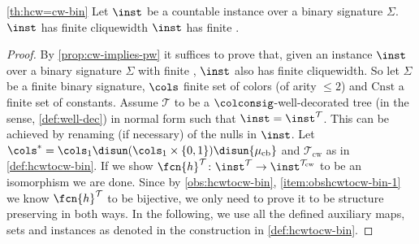 \begin{customprop}{\ref{th:hcw=cw-bin}}
	Let $\inst$ be a countable instance over a binary signature $\Sigma$.
	$\inst$ has finite cliquewidth \iffi $\inst$ has finite \ercwidth{}.
\end{customprop}
\begin{proof}
	By \cref{prop:cw-implies-pw} it suffices to prove that, given an instance $\inst$ over a binary signature $\Sigma$ with finite \partitionwidth{}, $\inst$ also has finite cliquewidth.
	So let $\Sigma$ be a finite binary signature, $\cols$ finite set of colors (of arity $\le 2$) and $\mathrm{Cnst}$ a finite set of constants. 
	Assume $\mathcal{T}$ to be a $\colconsig$-well-decorated tree (in the \partitionwidth{} sense, \cref{def:well-dec}) in normal form such that $\inst = \inst^{\mathcal{T}}$. This can be achieved by renaming (if necessary) of the nulls in $\inst$. 
	Let $\cols^{\ast} = \cols_1\disun (\cols_1\times \{ 0,1 \})\disun \{ \mu_{\mathrm{cb}}\}$ and $\mathcal{T}_{\mathrm{cw}}$ as in \cref{def:hcwtocw-bin}. If we show $\fcn{h}^{\mathcal{T}}\colon \inst^{\mathcal{T}} \to \inst^{\mathcal{T}_{\mathrm{cw}}}$ to be an isomorphism we are done. Since by \cref{obs:hcwtocw-bin}, \cref{item:obshcwtocw-bin-1} we know $\fcn{h}^{\mathcal{T}}$ to be bijective, we only need to prove it to be structure preserving in both ways. In the following, we use all the defined auxiliary maps, sets and instances as denoted in the construction in \cref{def:hcwtocw-bin}.
	

\end{proof}
